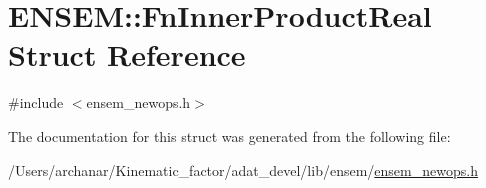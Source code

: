 \hypertarget{structENSEM_1_1FnInnerProductReal}{}\section{E\+N\+S\+EM\+:\+:Fn\+Inner\+Product\+Real Struct Reference}
\label{structENSEM_1_1FnInnerProductReal}


{\ttfamily \#include $<$ensem\+\_\+newops.\+h$>$}



The documentation for this struct was generated from the following file\+:\begin{DoxyCompactItemize}
\item 
/\+Users/archanar/\+Kinematic\+\_\+factor/adat\+\_\+devel/lib/ensem/\mbox{\hyperlink{lib_2ensem_2ensem__newops_8h}{ensem\+\_\+newops.\+h}}\end{DoxyCompactItemize}
